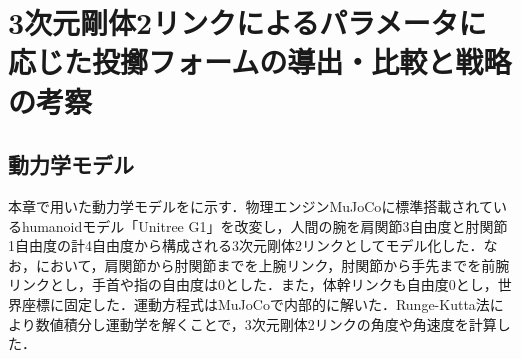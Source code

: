\section{3次元剛体2リンクによるパラメータに応じた投擲フォームの導出・比較と戦略の考察}
\subsection{動力学モデル}
本章で用いた動力学モデルをに示す．物理エンジンMuJoCo\cite{mujoco}に標準搭載されているhumanoidモデル「Unitree G1」\cite{unitreeg1}を改変し，人間の腕を肩関節3自由度と肘関節1自由度の計4自由度から構成される3次元剛体2リンクとしてモデル化した．なお，において，肩関節から肘関節までを上腕リンク，肘関節から手先までを前腕リンクとし，手首や指の自由度は0とした．また，体幹リンクも自由度0とし，世界座標に固定した．運動方程式はMuJoCoで内部的に解いた．Runge-Kutta法により数値積分し運動学を解くことで，3次元剛体2リンクの角度や角速度を計算した．

